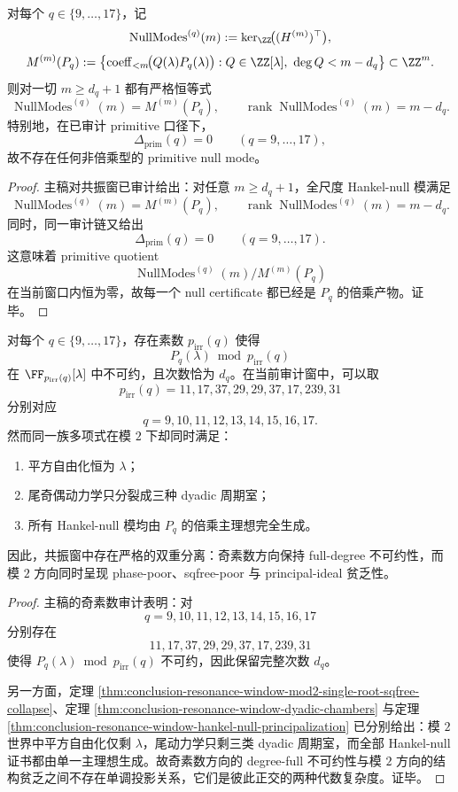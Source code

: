 \begin{theorem}\label{thm:conclusion-resonance-window-hankel-null-principalization}
对每个 \(q\in\{9,\dots,17\}\)，记
\[
\operatorname{NullModes}^{(q)}(m):=\ker_{\ZZ}\!\bigl((H^{(m)})^\top\bigr),
\]
\[
M^{(m)}(P_q):=
\left\{
\operatorname{coeff}_{<m}\!\bigl(Q(\lambda)P_q(\lambda)\bigr):
Q\in\ZZ[\lambda],\ \deg Q<m-d_q
\right\}\subset \ZZ^m.
\]
则对一切 \(m\ge d_q+1\) 都有严格恒等式
\[
\operatorname{NullModes}^{(q)}(m)=M^{(m)}(P_q),
\qquad
\operatorname{rank}\operatorname{NullModes}^{(q)}(m)=m-d_q.
\]
特别地，在已审计 primitive 口径下，
\[
\Delta_{\mathrm{prim}}(q)=0
\qquad
(q=9,\dots,17),
\]
故不存在任何非倍乘型的 primitive null mode。
\end{theorem}
\begin{proof}
主稿对共振窗已审计给出：对任意 \(m\ge d_q+1\)，全尺度 Hankel-null 模满足
\[
\operatorname{NullModes}^{(q)}(m)=M^{(m)}(P_q),
\qquad
\operatorname{rank}\operatorname{NullModes}^{(q)}(m)=m-d_q.
\]
同时，同一审计链又给出
\[
\Delta_{\mathrm{prim}}(q)=0
\qquad
(q=9,\dots,17).
\]
这意味着 primitive quotient
\[
\operatorname{NullModes}^{(q)}(m)\big/M^{(m)}(P_q)
\]
在当前窗口内恒为零，故每一个 null certificate 都已经是 \(P_q\) 的倍乘产物。证毕。
\end{proof}

\begin{theorem}\label{thm:conclusion-resonance-window-oddprime-fulldegree-vs-mod2-poverty}
对每个 \(q\in\{9,\dots,17\}\)，存在素数 \(p_{\mathrm{irr}}(q)\) 使得
\[
P_q(\lambda)\bmod p_{\mathrm{irr}}(q)
\]
在 \(\FF_{p_{\mathrm{irr}}(q)}[\lambda]\) 中不可约，且次数恰为 \(d_q\)。在当前审计窗中，可以取
\[
p_{\mathrm{irr}}(q)=11,17,37,29,29,37,17,239,31
\]
分别对应
\[
q=9,10,11,12,13,14,15,16,17.
\]
然而同一族多项式在模 \(2\) 下却同时满足：
\begin{enumerate}
\normalfont
  \item 平方自由化恒为 \(\lambda\)；
  \item 尾奇偶动力学只分裂成三种 dyadic 周期室；
  \item 所有 Hankel-null 模均由 \(P_q\) 的倍乘主理想完全生成。
\end{enumerate}
因此，共振窗中存在严格的双重分离：奇素数方向保持 full-degree 不可约性，而模 \(2\) 方向同时呈现 phase-poor、sqfree-poor 与 principal-ideal 贫乏性。
\end{theorem}
\begin{proof}
主稿的奇素数审计表明：对
\[
q=9,10,11,12,13,14,15,16,17
\]
分别存在
\[
11,17,37,29,29,37,17,239,31
\]
使得 \(P_q(\lambda)\bmod p_{\mathrm{irr}}(q)\) 不可约，因此保留完整次数 \(d_q\)。

另一方面，定理 \ref{thm:conclusion-resonance-window-mod2-single-root-sqfree-collapse}、定理 \ref{thm:conclusion-resonance-window-dyadic-chambers} 与定理 \ref{thm:conclusion-resonance-window-hankel-null-principalization} 已分别给出：模 \(2\) 世界中平方自由化仅剩 \(\lambda\)，尾动力学只剩三类 dyadic 周期室，而全部 Hankel-null 证书都由单一主理想生成。故奇素数方向的 degree-full 不可约性与模 \(2\) 方向的结构贫乏之间不存在单调投影关系，它们是彼此正交的两种代数复杂度。证毕。
\end{proof}

